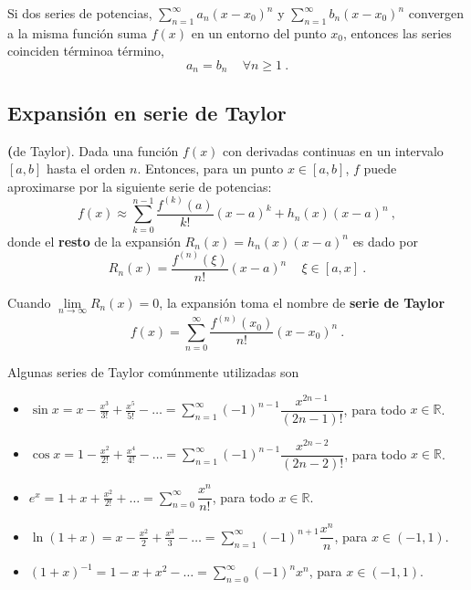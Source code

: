 \begin{teorema}
    Si dos series de potencias, $\sum\limits_{n=1}^\infty a_n(x-x_0)^n$ y $\sum\limits_{n=1}^\infty b_n(x-x_0)^n$ convergen a la misma función suma $f(x)$ en un entorno del punto $x_0$, entonces las series coinciden términoa término,
    \begin{equation*}
        a_n = b_n \, \quad \forall n \geq 1 \ .
    \end{equation*}
\end{teorema}


\subsection{Expansión en serie de Taylor}

\begin{teorema}{\textbf(de Taylor).}
    Dada una función $f(x)$ con derivadas continuas en un intervalo $[a, b]$ hasta el orden $n$. Entonces, para un punto $x \in [a,b]$, $f$ puede aproximarse por la siguiente serie de potencias:
    \begin{equation}
        f(x) \approx \sum_{k=0}^{n-1} \frac{f^{(k)}(a)}{k!} (x-a)^k + h_n(x) (x-a)^{n} \ ,
    \end{equation}    
    donde el \textbf{resto} de la expansión $R_n(x) = h_n(x) (x-a)^n$ es dado por
    \begin{equation}
        R_n(x) =  \frac{f^{(n)}(\xi)}{n!} (x-a)^n \, \quad \xi \in [a, x] \ .
    \end{equation}

    Cuando $\lim\limits_{n \to \infty} R_n(x) = 0$, la expansión toma el nombre de \textbf{serie de Taylor}
    \begin{equation}
        f(x) = \sum_{n=0}^{\infty} \frac{f^{(n)}(x_0)}{n!} (x-x_0)^n \ .
    \end{equation}   
\end{teorema}

\begin{ejemplo}
    Algunas series de Taylor comúnmente utilizadas son 
    \begin{itemize}
        \item $\sin x = x - \frac{x^3}{3!} + \frac{x^5}{5!} - \dots = \sum\limits_{n=1}^\infty (-1)^{n-1} \dfrac{x^{2n-1}}{(2n-1)!}$, para todo $x \in \mathbb{R}$.
        \item $\cos x = 1 - \frac{x^2}{2!} + \frac{x^4}{4!} - \dots = \sum\limits_{n=1}^\infty (-1)^{n-1} \dfrac{x^{2n-2}}{(2n-2)!}$, para todo $x \in \mathbb{R}$.
        \item $e^x = 1 + x + \frac{x^2}{2!} + \dots = \sum\limits_{n=0}^\infty \dfrac{x^n}{n!}$, para todo $x \in \mathbb{R}$.
        \item $\ln(1+x) = x - \frac{x^2}{2} + \frac{x^3}{3} - \dots = \sum\limits_{n=1}^\infty (-1)^{{n+1}} \dfrac{x^n}{n}$, para $x \in (-1,1)$.
        \item $(1+x)^{-1} = 1 - x + x^2 - \dots = \sum\limits_{n=0}^\infty (-1)^n x^n$, para $x \in (-1,1)$.
    \end{itemize}
\end{ejemplo}

